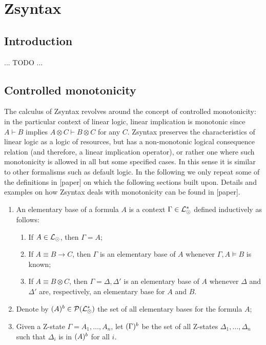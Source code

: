 \section{Zsyntax}

\subsection{Introduction}

... TODO ...

\subsection{Controlled monotonicity}

The calculus of Zsyntax revolves around the concept of controlled monotonicity:
in the particular context of linear logic, linear implication is monotonic since
$A \vdash B$ implies $A \otimes C \vdash B \otimes C$ for any $C$. Zsyntax
preserves the characteristics of linear logic as a logic of resources, but has a
non-monotonic logical consequence relation (and therefore, a linear implication
operator), or rather one where such monotonicity is allowed in all but some
specified cases. In this sense it is similar to other formalisms such as default
logic. In the following we only repeat some of the definitions in [paper] on
which the following sections built upon. Details and examples on how Zsyntax
deals with monotonicity can be found in [paper].

\begin{definition}
  \begin{enumerate}
  \item An elementary base of a formula $A$ is a context
    $\Gamma \in \mathcal{L}_{\odot}^*$ defined inductively as follows:

    \begin{enumerate}
    \item If $A \in \mathcal{L}_{\odot}$, then $\Gamma = A$;
    \item If $A \equiv B \rightarrow C$, then $\Gamma$ is an elementary base of
      $A$ whenever $\Gamma, A \models B$ is known;
    \item If $A \equiv B \otimes C$, then $\Gamma = \Delta, \Delta'$ is an
      elementary base of $A$ whenever $\Delta$ and $\Delta'$ are, respectively,
      an elementary base for $A$ and $B$.
    \end{enumerate}

  \item Denote by $(A)^{b} \in \mathcal{P}(\mathcal{L}_{\odot}^*)$ the set of all
    elementary bases for the formula $A$;
  \item Given a Z-state $\Gamma = A_1, \dots, A_n$, let $(\Gamma)^{b}$ be
    the set of all Z-states $\Delta_1, \dots, \Delta_n$ such that $\Delta_i$ is
    in $(A)^{b}$ for all $i$.
  \end{enumerate}
\end{definition}

